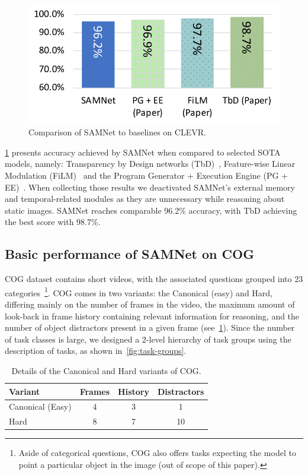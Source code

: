 \begin{figure}[htbp]
	\centering
	\includegraphics[width=0.8\columnwidth]{../img/plots/clevr_baselines.pdf}
	\caption{Comparison of SAMNet to baselines on CLEVR.}
	\label{fig:clevr_baselines}
\end{figure}

\cref{fig:clevr_baselines} presents accuracy achieved by SAMNet when compared to selected SOTA models, namely: Transparency by Design networks (TbD)~\cite{mascharka2018transparency}, Feature-wise Linear Modulation (FiLM)~\cite{perez2018film} and the Program Generator + Execution Engine (PG + EE)~\cite{johnson2017inferring}.
When collecting those results we deactivated SAMNet's external memory and temporal-related modules as they are unnecessary while reasoning about static images.
SAMNet reaches comparable 96.2\% accuracy, with TbD achieving the best score with 98.7\%.


\subsection{Basic performance of SAMNet on COG}
\label{sec:cog-baseline-compare}

COG dataset contains short videos, with the associated questions grouped into 23 categories~\footnote{Aside of categorical questions, COG also offers tasks expecting the model to point a particular object in the image (out of scope of this paper).}.
COG comes in two variants: the Canonical (easy) and Hard, differing mainly on the number of frames in the video, the maximum amount of look-back in frame history containing relevant information for reasoning, and the number of object distractors present in a given frame (see~\cref{tab:cog_variants}).
Since the number of task classes is large, we designed a 2-level hierarchy of task groups using the
description of tasks, as shown in~\cref{fig:task-groups}.

\begin{table}[ht]
	\centering
	\begin{tabular}{lccc}
		\toprule
		Variant	& Frames & History	& Distractors \\
		\midrule
		Canonical (Easy) & 4 & 3 & 1\\
		Hard  & 8 & 7 & 10\\
		\bottomrule
	\end{tabular}
	\caption{Details of the Canonical and Hard variants of COG.}
	\label{tab:cog_variants}
\end{table}


